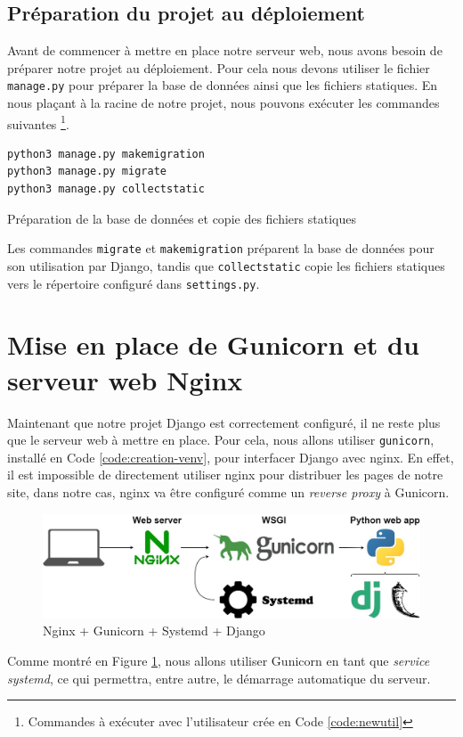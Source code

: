 \documentclass{article}
\begin{document}
        \subsection{Préparation du projet au déploiement}
        Avant de commencer à mettre en place notre serveur web, nous avons besoin de préparer notre projet au déploiement.
        Pour cela nous devons utiliser le fichier \verb|manage.py| pour préparer la base de données ainsi que les fichiers statiques. En nous plaçant à la racine de notre projet, nous pouvons exécuter les commandes suivantes
        \footnote{Commandes à exécuter avec l'utilisateur crée en Code \ref{code:newutil}}.
        \begin{listing}[H]
            \begin{verbatim}
python3 manage.py makemigration
python3 manage.py migrate
python3 manage.py collectstatic
            \end{verbatim}
            \caption{Préparation de la base de données et copie des fichiers statiques}
            \label{code:manage.py}
        \end{listing}
        Les commandes \verb|migrate| et \verb|makemigration| préparent la base de données pour son utilisation par Django, tandis que \verb|collectstatic| copie les fichiers statiques vers le répertoire configuré dans \verb|settings.py|.

\section{Mise en place de Gunicorn et du serveur web Nginx}
    Maintenant que notre projet Django est correctement configuré, il ne reste plus que le serveur web à mettre en place. Pour cela, nous allons utiliser \verb|gunicorn|, installé en Code \ref{code:creation-venv}, pour interfacer Django avec nginx.
    En effet, il est impossible de directement utiliser nginx pour distribuer les pages de notre site, dans notre cas, nginx va être configuré comme un \emph{reverse proxy} à Gunicorn.
    \begin{figure}[H]
        \includegraphics[width=\linewidth]{fig/gunicorn.jpeg}
        \caption{Nginx + Gunicorn + Systemd + Django}
        \label{fig:gunicorn}
    \end{figure}
    Comme montré en Figure \ref{fig:gunicorn}, nous allons utiliser Gunicorn en tant que \emph{service systemd}, ce qui permettra, entre autre, le démarrage automatique du serveur.
\end{document}
